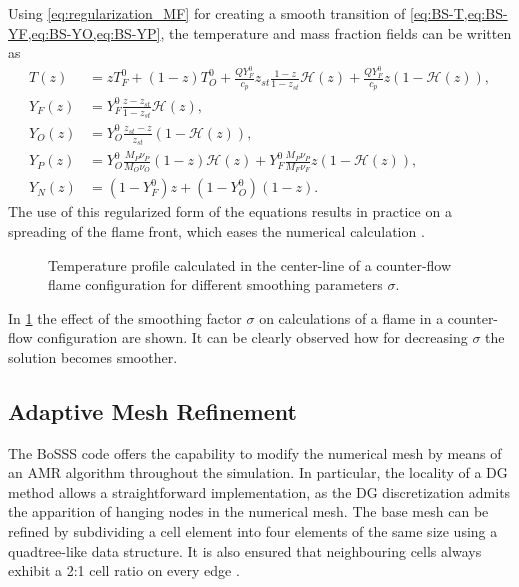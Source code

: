 Using \cref{eq:regularization_MF} for creating a smooth transition of \cref{eq:BS-T,eq:BS-YF,eq:BS-YO,eq:BS-YP}, the temperature and mass fraction fields can be written as
\begin{subequations}
	\begin{align}
		T(z)   & = z T_F^0 + (1-z)T_O^0 + \frac{Q Y_F^0}{c_p} z_{st}\frac{1- z}{1-z_{st}}\mathcal{H}(z) +  \frac{Q Y_F^0}{c_p}z\left(1-\mathcal{H}(z)\right),  \label{eq:BS-TR} \\[1ex]
		Y_F(z) & = Y_F^0\frac{z - z_{st}}{1-z_{st}} \mathcal{H}(z), \label{eq:BS-YFR}                                                                                           \\[1ex]
		Y_O(z) & = Y_O^0 \frac{z_{st}-z}{z_{st}} (1-\mathcal{H}(z)), \label{eq:BS-YOR}                                                                                          \\[1ex]
		Y_P(z) & =  Y_O^0\frac{M_P\nu_P}{M_O\nu_O}(1-z)\mathcal{H}(z) +	Y_F^0\frac{M_P\nu_P}{M_F\nu_F}z (1-\mathcal{H}(z)), \label{eq:BS-YPR}                                   \\[1ex]
		Y_N(z) & = (1-Y_F^0)z + (1-Y_O^0)(1-z). \label{eq:BS-YNR}
	\end{align}
\end{subequations}
The use of this regularized form of the equations results in practice on a spreading of the flame front, which eases the numerical calculation \parencite{braackAdaptiveFiniteElement1997}.
\begin{figure}[h]
	\centering
	\caption{Temperature profile calculated in the center-line of a counter-flow flame configuration for different smoothing parameters $\sigma$.}
	\label{fig:smoothings}
\end{figure}
In \cref{fig:smoothings} the effect of the smoothing factor $\sigma$ on calculations of a flame in a counter-flow configuration are shown. It can be clearly observed how for decreasing $\sigma$ the solution becomes smoother.


\subsection{Adaptive Mesh Refinement}\label{ssec:MeshRefinement}
The BoSSS code offers the capability to modify the numerical mesh by means of an \gls{AMR}  algorithm throughout the simulation. In particular, the locality of a DG method allows a straightforward implementation, as the DG discretization admits the apparition of hanging nodes in the numerical mesh. The base mesh can be refined by subdividing a cell element into four elements of the same size using a quadtree-like data structure. It is also ensured that neighbouring cells always exhibit a 2:1 cell ratio on every edge \parencite{smudamartinDirectNumericalSimulation2021}. 

